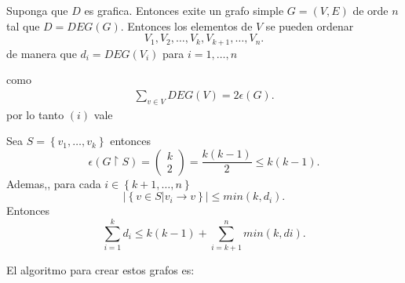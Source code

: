 \documentclass{report}
\begin{document}
\begin{myproof}
  Suponga que $D$ es grafica. Entonces exite un grafo simple $G=\left( V,E \right) $ de orde $n$ tal que $D=DEG\left( G \right) $. Entonces los elementos de $V$ se pueden ordenar \[
  V_1,V_2,\ldots,V_k,V_{k+1},\ldots,V_{n}
  .\] de manera que $d_i=DEG\left( V_i \right) $ para $i = 1,\ldots,n$

  como
  \begin{align*}
    \sum_{v\in V} DEG\left( V \right) = 2\epsilon\left( G \right)
  .\end{align*} por lo tanto $(i)$ vale

  Sea $S=\left\{ v_{1},\ldots,v_k \right\} $ entonces \[
  \epsilon\left( G\upharpoonright S \right) = \begin{pmatrix} k \\ 2 \end{pmatrix} = \frac{k\left( k-1 \right) }{2} \le  k\left( k - 1 \right)
  .\] Ademas,, para cada $i \in \left\{ k+1,\ldots, n \right\} $ \[
  |\left\{ v \in S | v_i \to v \right\} | \le min(k,d_i)
  .\] Entonces \[
  \sum_{i=1}^{k} d_i \le k\left( k-1 \right) + \sum_{i=k+1}^{n} min\left( k,di \right)
  .\]

\end{myproof}

El algoritmo para crear estos grafos es:
\end{document}
